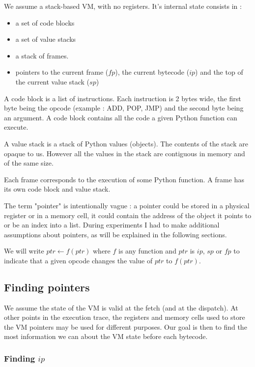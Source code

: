\documentclass[french]{article}
\begin{document}
We assume a stack-based VM, with no registers. It's internal state consists in :
\begin{itemize}
	\item a set of code blocks 
	\item a set of value stacks 
	\item a stack of frames.  
	\item pointers to the current frame ($fp$), the current bytecode ($ip$) and the top of the current value stack ($sp$)
\end{itemize}

A code block is a list of instructions. Each instruction is 2 bytes wide, the first byte being the opcode (example : ADD, POP, JMP) and the second byte being an argument. A code block contains all the code a given Python function can execute.

A value stack is a stack of Python values (objects). The contents of the stack are opaque to us. However all the values in the stack are contiguous in memory and of the same size.

Each frame corresponds to the execution of some Python function. A frame has its own code block and value stack.

The term "pointer" is intentionally vague : a pointer could be stored in a physical register or in a memory cell, it could contain the address of the object it points to or be an index into a list. During experiments I had to make additional assumptions about pointers, as will be explained in the following sections.

We will write $ptr \leftarrow f(ptr)$ where $f$ is any function and $ptr$ is $ip$, $sp$ or $fp$ to indicate that a given opcode changes the value of $ptr$ to $f(ptr)$.

\subsection{Finding pointers}

We assume the state of the VM is valid at the fetch (and at the dispatch). At other points in the execution trace, the registers and memory cells used to store the VM pointers may be used for different purposes. Our goal is then to find the most information we can about the VM state before each bytecode.

\subsubsection{Finding $ip$}
\end{document}

